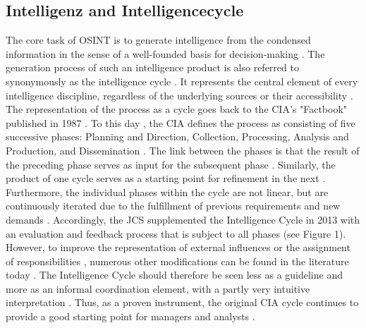 \documentclass[10pt]{article}
\begin{document}
\subsection{Intelligenz and Intelligencecycle}
The core task of OSINT is to generate intelligence \cite{Hwang.2022,Dokman.2020} from the condensed information in the sense of a well-founded basis for decision-making \cite{Breakspear.2013,May.2020}. The generation process of such an intelligence product is also referred to synonymously as the intelligence cycle \cite{HerreraCubides.2020,CentralIntelligenceAgency.1987}. It represents the central element of every intelligence discipline, regardless of the underlying sources or their accessibility \cite{Reuser.2017,Dokman.2020}. The representation of the process as a cycle \cite{DirectorofNationalIntelligence.2011} goes back to the CIA's "Factbook" published in 1987 \cite{CentralIntelligenceAgency.1987}. To this day \cite{CentralIntelligenceAgency.2023}, the CIA defines the process as consisting of five successive phases: Planning and Direction, Collection, Processing, Analysis and Production, and Dissemination \cite{CentralIntelligenceAgency.1987}. The link between the phases is that the result of the preceding phase serves as input for the subsequent phase \cite{JointChiefsofStaffU.S.Army.2013,Pellissier.2013}. Similarly, the product of one cycle serves as a starting point for refinement in the next \cite{Dokman.2020,Gibson.2016}. Furthermore, the individual phases within the cycle are not linear, but are continuously iterated due to the fulfillment of previous requirements and new demands \cite{Gibson.2016}. Accordingly, the JCS supplemented the Intelligence Cycle in 2013 with an evaluation and feedback process that is subject to all phases \cite{JointChiefsofStaffU.S.Army.2013} (see Figure 1). However, to improve the representation of external influences or the assignment of responsibilities \cite{Lowenthal.2020,Phythian.2013,Johnston.2005}, numerous other modifications can be found in the literature today \cite{Bohm.2021,Reuser.2017}. The Intelligence Cycle should therefore be seen less as a guideline and more as an informal coordination element, with a partly very intuitive \cite{Breakspear.2013} interpretation \cite{Hwang.2022}. Thus, as a proven instrument, the original CIA cycle continues to provide a good starting point for managers and analysts \cite{Lowenthal.2020,NorthAtlanticTreatyOrganization.2001}.
\newline
\newline
\end{document}
